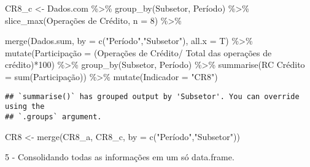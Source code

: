 \documentclass[
]{article}
\newenvironment{Shaded}{\begin{snugshade}}{\end{snugshade}}
\newcommand{\AttributeTok}[1]{\textcolor[rgb]{0.77,0.63,0.00}{#1}}
\newcommand{\DecValTok}[1]{\textcolor[rgb]{0.00,0.00,0.81}{#1}}
\newcommand{\FunctionTok}[1]{\textcolor[rgb]{0.00,0.00,0.00}{#1}}
\newcommand{\NormalTok}[1]{#1}
\newcommand{\OtherTok}[1]{\textcolor[rgb]{0.56,0.35,0.01}{#1}}
\newcommand{\SpecialCharTok}[1]{\textcolor[rgb]{0.00,0.00,0.00}{#1}}
\newcommand{\StringTok}[1]{\textcolor[rgb]{0.31,0.60,0.02}{#1}}
\begin{document}
\begin{Shaded}
\begin{Highlighting}[]
\NormalTok{CR8\_c }\OtherTok{\textless{}{-}}\NormalTok{ Dados.com }\SpecialCharTok{\%\textgreater{}\%} 
  \FunctionTok{group\_by}\NormalTok{(Subsetor, Período) }\SpecialCharTok{\%\textgreater{}\%} 
  \FunctionTok{slice\_max}\NormalTok{(}\StringTok{\textasciigrave{}}\AttributeTok{Operações de Crédito}\StringTok{\textasciigrave{}}\NormalTok{, }\AttributeTok{n =} \DecValTok{8}\NormalTok{) }\SpecialCharTok{\%\textgreater{}\%}
  
  \FunctionTok{merge}\NormalTok{(Dados.sum, }\AttributeTok{by =} \FunctionTok{c}\NormalTok{(}\StringTok{"Período"}\NormalTok{,}\StringTok{"Subsetor"}\NormalTok{), }\AttributeTok{all.x =}\NormalTok{ T) }\SpecialCharTok{\%\textgreater{}\%}
  \FunctionTok{mutate}\NormalTok{(Participação }\OtherTok{=}\NormalTok{ (}\StringTok{\textasciigrave{}}\AttributeTok{Operações de Crédito}\StringTok{\textasciigrave{}}\SpecialCharTok{/}
                         \StringTok{\textasciigrave{}}\AttributeTok{Total das operações de crédito}\StringTok{\textasciigrave{}}\NormalTok{)}\SpecialCharTok{*}\DecValTok{100}\NormalTok{) }\SpecialCharTok{\%\textgreater{}\%}
  \FunctionTok{group\_by}\NormalTok{(Subsetor, Período) }\SpecialCharTok{\%\textgreater{}\%}
  \FunctionTok{summarise}\NormalTok{(}\StringTok{\textasciigrave{}}\AttributeTok{RC Crédito}\StringTok{\textasciigrave{}} \OtherTok{=} \FunctionTok{sum}\NormalTok{(Participação)) }\SpecialCharTok{\%\textgreater{}\%} \FunctionTok{mutate}\NormalTok{(}\AttributeTok{Indicador =} \StringTok{"CR8"}\NormalTok{)}
\end{Highlighting}
\end{Shaded}

\begin{verbatim}
## `summarise()` has grouped output by 'Subsetor'. You can override using the
## `.groups` argument.
\end{verbatim}

\begin{Shaded}
\begin{Highlighting}[]
\NormalTok{CR8 }\OtherTok{\textless{}{-}} \FunctionTok{merge}\NormalTok{(CR8\_a, CR8\_c, }\AttributeTok{by =} \FunctionTok{c}\NormalTok{(}\StringTok{"Período"}\NormalTok{,}\StringTok{"Subsetor"}\NormalTok{))}
\end{Highlighting}
\end{Shaded}

5 - Consolidando todas as informações em um só data.frame.
\end{document}
